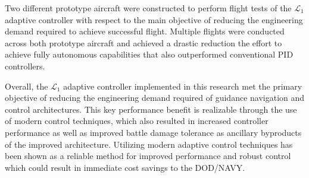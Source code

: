 \documentclass[twoside,thesis,twoadvisorsreader]{npsreport}
\newcommand{\Lone}{$\mathcal{L}_1$ }
\begin{document}
{Two different prototype aircraft were constructed to perform flight tests of the \Lone adaptive controller with respect to the main objective of reducing the engineering demand required to achieve successful flight.  Multiple flights were conducted across both prototype aircraft and achieved a drastic reduction the effort to achieve fully autonomous capabilities that also outperformed conventional PID controllers.  

Overall, the \Lone adaptive controller implemented in this research met the primary objective of reducing the engineering demand required of guidance navigation and control architectures.  This key performance benefit is realizable through the use of modern control techniques, which also resulted in increased controller performance as well as improved battle damage tolerance as ancillary byproducts of the improved architecture.  Utilizing modern adaptive control techniques has been shown as a reliable method for improved performance and robust control which could result in immediate cost savings to the DOD/NAVY.
}


\NPSbody




%
\end{document}
